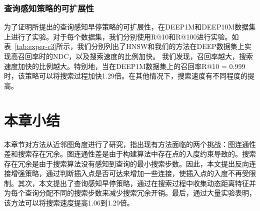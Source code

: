 \subsubsection{查询感知策略的可扩展性}
为了证明所提出的查询感知早停策略的可扩展性，在DEEP1M和DEEP10M数据集上进行了实验。对于每个数据集，我们分别使用R@10和R@100进行实验。如表~\ref{tab:exper-c3}所示，我们分别列出了HNSW和我们的方法在DEEP数据集上实现高召回率时的NDC，以及搜索速度的比例加快。
我们发现，召回率越大，搜索速度加快的比例越大。特别地，当在DEEP1M数据集上的召回率R@10 = 0.999时，该策略可以将搜索过程加快1.29倍。在其他情况下，搜索速度有不同程度的提高。

\begin{table}[htbp]
  \centering
  \caption{在相同召回率的情况下，采用查询感知早停策略所需的距离计算量(NDC)与基线算法的比较。}
  \label{tab:exper-c3}
\end{table}


\section{本章小结}
本章节对\ganns 方法从近邻图角度进行了研究，指出现有方法面临的两个挑战：图连通性差和搜索存在冗余。图连通性差是由于构建算法中存在点的入度约束导致的。搜索存在冗余是由于搜索算法没有感知到查询的最小搜索步数。因此，本文提出反向连接增强策略，通过判断插入点是否可达来增加一些连接，使插入点的入度不再受限制。其次，本文提出了查询感知早停策略，通过在搜索过程中收集动态距离特征并为每个查询分配不同的搜索步数来减少搜索冗余开销。最后，通过大量实验表明，该方法可以将搜索速度提高1.06到1.29倍。
